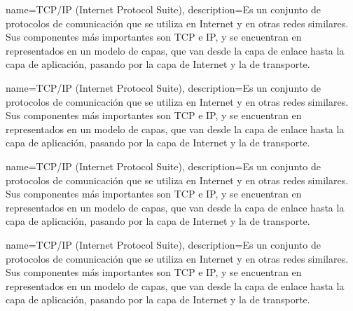 {name=TCP/IP (Internet Protocol Suite),
 description={Es un conjunto de protocolos de comunicación que se utiliza en Internet y en otras redes similares. Sus componentes más importantes son TCP e IP, y se encuentran en representados en un modelo de capas, que van desde la capa de enlace hasta la capa de aplicación, pasando por la capa de Internet y la de transporte.}
 }
 
{name=TCP/IP (Internet Protocol Suite),
 description={Es un conjunto de protocolos de comunicación que se utiliza en Internet y en otras redes similares. Sus componentes más importantes son TCP e IP, y se encuentran en representados en un modelo de capas, que van desde la capa de enlace hasta la capa de aplicación, pasando por la capa de Internet y la de transporte.}
 }
 
{name=TCP/IP (Internet Protocol Suite),
 description={Es un conjunto de protocolos de comunicación que se utiliza en Internet y en otras redes similares. Sus componentes más importantes son TCP e IP, y se encuentran en representados en un modelo de capas, que van desde la capa de enlace hasta la capa de aplicación, pasando por la capa de Internet y la de transporte.}
 }
 
{name=TCP/IP (Internet Protocol Suite),
 description={Es un conjunto de protocolos de comunicación que se utiliza en Internet y en otras redes similares. Sus componentes más importantes son TCP e IP, y se encuentran en representados en un modelo de capas, que van desde la capa de enlace hasta la capa de aplicación, pasando por la capa de Internet y la de transporte.}
 }
